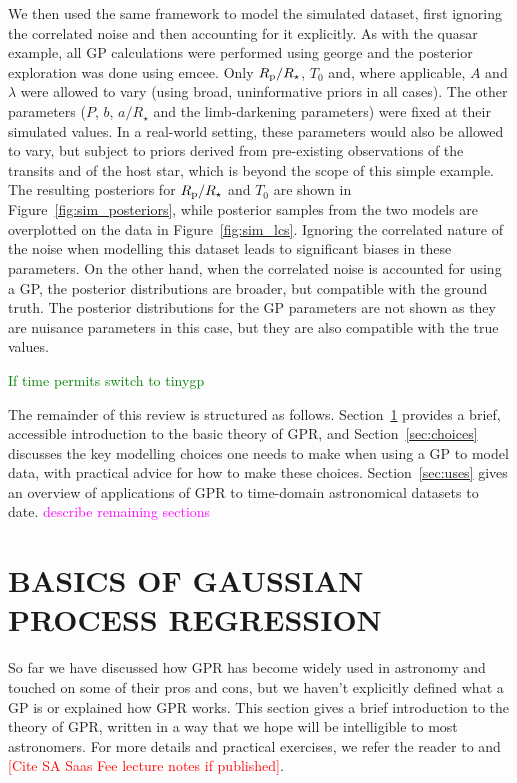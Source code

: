 \documentclass[letterpaper]{ar-1col}
\newcommand{\suz}[1]{\textcolor{magenta}{#1}}
\newcommand{\dan}[1]{\textcolor{green}{#1}}
\begin{document}
We then used the same framework to model the simulated dataset, first ignoring the correlated noise and then accounting for it explicitly. As with the quasar example, all GP calculations were performed using {\sc george} and the posterior exploration was done using {\sc emcee}. Only $R_{\rm p}/R_\star$, $T_0$ and, where applicable, $A$ and $\lambda$ were allowed to vary (using broad, uninformative priors in all cases). The other parameters ($P$, $b$, $a/R_\star$ and the limb-darkening parameters) were fixed at their simulated values. In a real-world setting, these parameters would also be allowed to vary, but subject to priors derived from pre-existing observations of the transits and of the host star, which is beyond the scope of this simple example. The resulting posteriors for $R_{\rm p}/R_\star$ and $T_0$ are shown in Figure~\ref{fig:sim_posteriors}, while posterior samples from the two models are overplotted on the data in Figure~\ref{fig:sim_lcs}. Ignoring the correlated nature of the noise when modelling this dataset leads to significant biases in these parameters. On the other hand, when the correlated noise is accounted for using a GP, the posterior distributions are broader, but compatible with the ground truth. The posterior distributions for the GP parameters are not shown as they are nuisance parameters in this case, but they are also compatible with the true values.

\dan{If time permits switch to {\sc tinygp}}

\smallskip
The remainder of this review is structured as follows. Section~\ref{sec:basics} provides a brief, accessible introduction to the basic theory of GPR, and Section~\ref{sec:choices} discusses the key modelling choices one needs to make when using a GP to model data, with practical advice for how to make these choices. Section~\ref{sec:uses} gives an overview of applications of GPR to time-domain astronomical datasets to date. \suz{describe remaining sections}


\section{BASICS OF GAUSSIAN PROCESS REGRESSION}
\label{sec:basics}

So far we have discussed how GPR has become widely used in astronomy and touched on some of their pros and cons, but we haven't explicitly defined what a GP is or explained how GPR works. This section gives a brief introduction to the theory of GPR, written in a way that we hope will be intelligible to most astronomers. For more details and practical exercises, we refer the reader to \citet{gpml} and \textcolor{red}{[Cite SA Saas Fee lecture notes if published]}.
\end{document}
